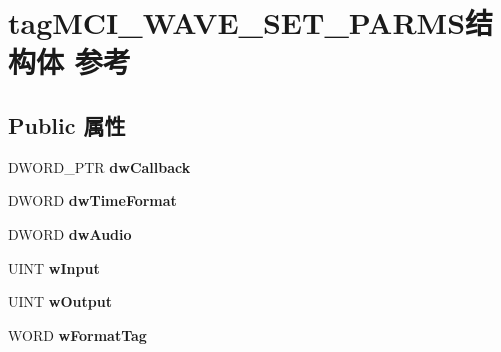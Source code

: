 \hypertarget{structtag_m_c_i___w_a_v_e___s_e_t___p_a_r_m_s}{}\section{tag\+M\+C\+I\+\_\+\+W\+A\+V\+E\+\_\+\+S\+E\+T\+\_\+\+P\+A\+R\+M\+S结构体 参考}
\label{structtag_m_c_i___w_a_v_e___s_e_t___p_a_r_m_s}
\subsection*{Public 属性}
\begin{DoxyCompactItemize}
\item 
\mbox{\label{structtag_m_c_i___w_a_v_e___s_e_t___p_a_r_m_s_ad9cf0514e6422384c601c24ec14e7416}} 
D\+W\+O\+R\+D\+\_\+\+P\+TR {\bfseries dw\+Callback}
\item 
\mbox{\label{structtag_m_c_i___w_a_v_e___s_e_t___p_a_r_m_s_ae6d9786e466bbe9e014d7efc7366723b}} 
D\+W\+O\+RD {\bfseries dw\+Time\+Format}
\item 
\mbox{\label{structtag_m_c_i___w_a_v_e___s_e_t___p_a_r_m_s_ab5775184afa2001d70918dae0bccf3ac}} 
D\+W\+O\+RD {\bfseries dw\+Audio}
\item 
\mbox{\label{structtag_m_c_i___w_a_v_e___s_e_t___p_a_r_m_s_a5d8f0ed38fe85bf48cee0dc2a01145c5}} 
U\+I\+NT {\bfseries w\+Input}
\item 
\mbox{\label{structtag_m_c_i___w_a_v_e___s_e_t___p_a_r_m_s_ae2aa4185b4d3322411e7e0aed49db5a3}} 
U\+I\+NT {\bfseries w\+Output}
\item 
\mbox{\label{structtag_m_c_i___w_a_v_e___s_e_t___p_a_r_m_s_a3def8fa1b3012089eb5ae86c9358d6d5}} 
W\+O\+RD {\bfseries w\+Format\+Tag}
\item 
\mbox{\label{structtag_m_c_i___w_a_v_e___s_e_t___p_a_r_m_s_a14b03a8d76afb9ee0a915803e5688c41}} 

\end{DoxyCompactItemize}
